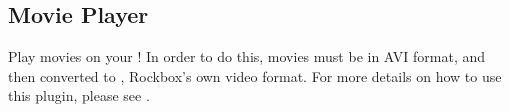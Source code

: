 \subsection{Movie Player}
Play movies on your \dap!  In order to do this, movies must be in AVI format,
and then converted to , Rockbox's own video format. For more
details on how to use this plugin, please see .
